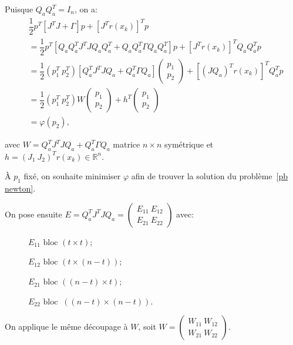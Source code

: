 Puisque $Q_{a}Q_{a}^T = I_n$, on a:
\begin{align*}
&\dfrac{1}{2}p^T\left[J^TJ + \Gamma\right]p + \left[J^Tr(x_{k})\right]^Tp \\
&= \dfrac{1}{2}p^T\left[Q_{a}Q_{a}^TJ^TJQ_{a}Q_{a}^T + Q_{a}Q_{a}^T\Gamma Q_{a}Q_{a}^T\right]p + \left[J^Tr(x_{k})\right]^TQ_{a}Q_{a}^Tp \\
&= \dfrac{1}{2}(p_1^T\ p_2^T) \left[Q_{a}^TJ^TJQ_{a} + Q_{a}^T\Gamma Q_{a}\right]\begin{pmatrix} p_1 \\ p_2\end{pmatrix} + \left[(JQ_{a})^Tr(x_{k})\right]^TQ_{a}^{T}p\\
&= \dfrac{1}{2}(p_1^T\ p_2^T)W\begin{pmatrix}p_1\\p_2\end{pmatrix} + h^T\begin{pmatrix}p_1\\p_2\end{pmatrix} \\
&= \varphi(p_2),
\end{align*}

avec $W = Q_{a}^TJ^TJQ_{a} + Q_{a}^T\Gamma Q_{a}$ matrice $n\times n$ symétrique et $h = (J_1\ J_2)^Tr(x_{k}) \in \mathbb{R}^n$. 

\`A $p_1$ fixé, on souhaite minimiser $\varphi$ afin de trouver la solution du problème~\eqref{pb newton}.

On pose ensuite $E =  Q_{a}^TJ^TJQ_{a} = \begin{pmatrix} E_{11}\ E_{12} \\ E_{21}\ E_{22} \end{pmatrix}$ avec:

\begin{description}
\item[\textbullet] $E_{11} \text{ bloc } (t\times t)$;
\item[\textbullet] $E_{12} \text{ bloc } (t\times (n-t))$;
\item[\textbullet] $E_{21}\text{ bloc } ((n-t)\times t)$;
\item[\textbullet] $E_{22}\text{ bloc }\ ((n-t)\times (n-t))$.
\end{description}

On applique le même découpage à $W$, soit $W = \begin{pmatrix} W_{11}\ W_{12} \\ W_{21}\ W_{22} \end{pmatrix}$. 

